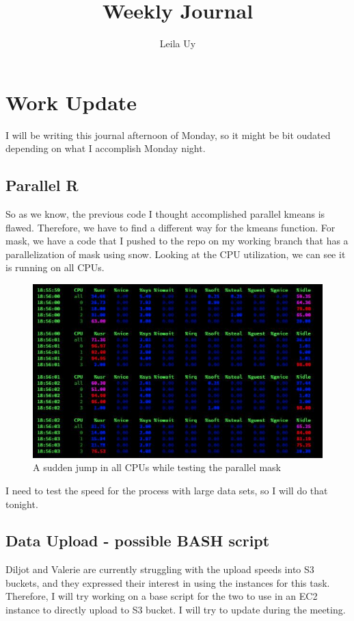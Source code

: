 \documentclass[a4paper,10pt]{article}
\title{Weekly Journal}
\author{Leila Uy}
\begin{document}
\maketitle

\section{Work Update}
I will be writing this journal afternoon of Monday, so it might be bit oudated depending on what I accomplish Monday night.

\subsection{Parallel R}
So as we know, the previous code I thought accomplished parallel kmeans is flawed. Therefore, we have to find a different way for the kmeans function. For mask, we have a code that I pushed to the repo on my working branch that has a parallelization of mask using snow. Looking at the CPU utilization, we can see it is running on all CPUs.
\begin{figure}[h!]
    \caption{A sudden jump in all CPUs while testing the parallel mask}
    \centering
    \includegraphics[scale=0.5]{mask-CPU-util.png}
\end{figure}

I need to test the speed for the process with large data sets, so I will do that tonight.

\subsection{Data Upload - possible BASH script}
Diljot and Valerie are currently struggling with the upload speeds into S3 buckets, and they expressed their interest in using the instances for this task. Therefore, I will try working on a base script for the two to use in an EC2 instance to directly upload to S3 bucket. I will try to update during the meeting.
\end{document}
